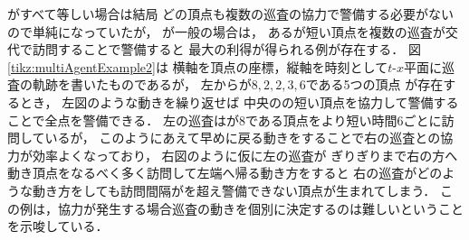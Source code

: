 {\timelimit}がすべて等しい場合は結局
どの頂点も複数の巡査の協力で警備する必要がないので単純になっていたが，
%
{\timelimit}が一般の場合は，
ある{\timelimit}が短い頂点を複数の巡査が交代で訪問することで警備すると
最大の利得が得られる例が存在する．
%
図\ref{tikz:multiAgentExample2}は
横軸を頂点の座標，縦軸を時刻として$t$-$x$平面に巡査の軌跡を書いたものであるが，
%
左から{\timelimit}が$8,2,2,3,6$である5つの頂点
が存在するとき，
左図のような動きを繰り返せば
中央の{\timelimit}の短い頂点を協力して警備することで全点を警備できる．
左の巡査は{\timelimit}が$8$である頂点をより短い時間$6$ごとに訪問しているが，
このようにあえて早めに戻る動きをすることで右の巡査との協力が効率よくなっており，
右図のように仮に左の巡査が
{\timelimit}ぎりぎりまで右の方へ動き頂点をなるべく多く訪問して左端へ帰る動き方をすると
右の巡査がどのような動き方をしても訪問間隔が{\timelimit}を超え警備できない頂点が生まれてしまう．
%
この例は，協力が発生する場合巡査の動きを個別に決定するのは難しいということを示唆している．
%

